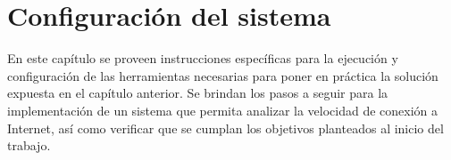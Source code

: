 \chapter{Configuración del sistema}
En este capítulo se proveen instrucciones específicas para la ejecución y configuración de las herramientas necesarias para poner en práctica la solución expuesta en el capítulo anterior. Se brindan los pasos a seguir para la implementación de un sistema que permita analizar la velocidad de conexión a Internet, así como verificar que se cumplan los objetivos planteados al inicio del trabajo. 

